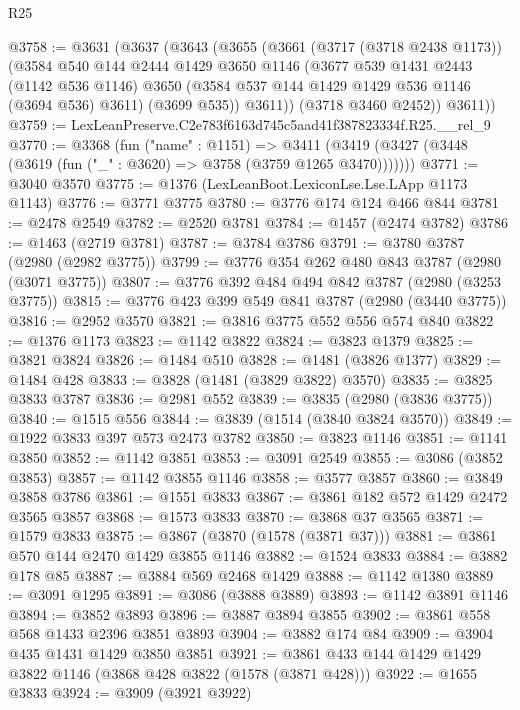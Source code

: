 \begin{lexlean}{R25}
\begin{coremodule}
@3758 := @3631
    (@3637
      (@3643
        (@3655
          (@3661
            (@3717 (@3718 @2438 @1173))
            (@3584
              @540
              @144
              @2444
              @1429
              @3650
              @1146
              (@3677
                @539
                @1431
                @2443
                (@1142 @536 @1146)
                @3650
                (@3584 @537 @144 @1429 @1429 @536 @1146 (@3694 @536) @3611)
                (@3699 @535))
              @3611))
          (@3718 @3460 @2452))
        @3611))
@3759 := LexLeanPreserve.C2e783f6163d745c5aad41f387823334f.R25.__rel_9
@3770 := @3368
    (fun ("name" : @1151) =>
    @3411 (@3419 (@3427 (@3448 (@3619 (fun ("_" : @3620) => @3758 (@3759 @1265 @3470)))))))
@3771 := @3040 @3570
@3775 := @1376 (LexLeanBoot.LexiconLse.Lse.LApp @1173 @1143)
@3776 := @3771 @3775
@3780 := @3776 @174 @124 @466 @844
@3781 := @2478 @2549
@3782 := @2520 @3781
@3784 := @1457 (@2474 @3782)
@3786 := @1463 (@2719 @3781)
@3787 := @3784 @3786
@3791 := @3780 @3787 (@2980 (@2982 @3775))
@3799 := @3776 @354 @262 @480 @843 @3787 (@2980 (@3071 @3775))
@3807 := @3776 @392 @484 @494 @842 @3787 (@2980 (@3253 @3775))
@3815 := @3776 @423 @399 @549 @841 @3787 (@2980 (@3440 @3775))
@3816 := @2952 @3570
@3821 := @3816 @3775 @552 @556 @574 @840
@3822 := @1376 @1173
@3823 := @1142 @3822
@3824 := @3823 @1379
@3825 := @3821 @3824
@3826 := @1484 @510
@3828 := @1481 (@3826 @1377)
@3829 := @1484 @428
@3833 := @3828 (@1481 (@3829 @3822) @3570)
@3835 := @3825 @3833 @3787
@3836 := @2981 @552
@3839 := @3835 (@2980 (@3836 @3775))
@3840 := @1515 @556
@3844 := @3839 (@1514 (@3840 @3824 @3570))
@3849 := @1922 @3833 @397 @573 @2473 @3782
@3850 := @3823 @1146
@3851 := @1141 @3850
@3852 := @1142 @3851
@3853 := @3091 @2549
@3855 := @3086 (@3852 @3853)
@3857 := @1142 @3855 @1146
@3858 := @3577 @3857
@3860 := @3849 @3858 @3786
@3861 := @1551 @3833
@3867 := @3861 @182 @572 @1429 @2472 @3565 @3857
@3868 := @1573 @3833
@3870 := @3868 @37 @3565
@3871 := @1579 @3833
@3875 := @3867 (@3870 (@1578 (@3871 @37)))
@3881 := @3861 @570 @144 @2470 @1429 @3855 @1146
@3882 := @1524 @3833
@3884 := @3882 @178 @85
@3887 := @3884 @569 @2468 @1429
@3888 := @1142 @1380
@3889 := @3091 @1295
@3891 := @3086 (@3888 @3889)
@3893 := @1142 @3891 @1146
@3894 := @3852 @3893
@3896 := @3887 @3894 @3855
@3902 := @3861 @558 @568 @1433 @2396 @3851 @3893
@3904 := @3882 @174 @84
@3909 := @3904 @435 @1431 @1429 @3850 @3851
@3921 := @3861 @433 @144 @1429 @1429 @3822 @1146 (@3868 @428 @3822 (@1578 (@3871 @428)))
@3922 := @1655 @3833
@3924 := @3909 (@3921 @3922)

\end{coremodule}
\end{lexlean}
